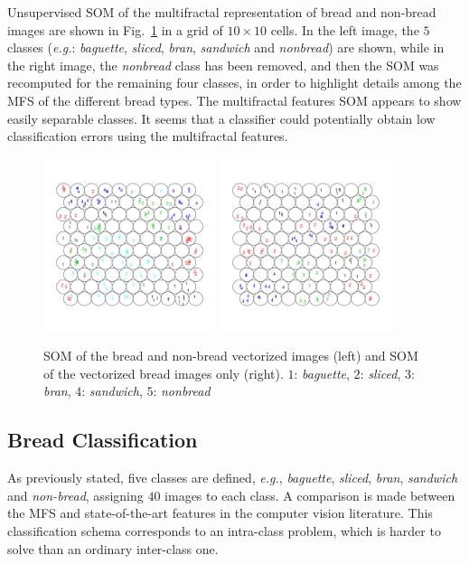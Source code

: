 \documentclass[a4paper,10pt]{article}
\begin{document}
Unsupervised SOM of the multifractal representation of bread and non-bread images are shown in Fig.~\ref{fig:somfractal} in a grid of $10\times10$ cells. In the left image, the $5$ classes ({\em e.g.}: {\em baguette}, {\em sliced}, {\em bran}, {\em sandwich} and {\em nonbread}) are shown, while in the right image, the {\em nonbread} class has been removed, and then the SOM was recomputed for the remaining four classes, in order to highlight details among the MFS of the different bread types. The multifractal features SOM appears to show easily separable classes. It seems that a classifier could potentially obtain low classification errors using the multifractal features.
\begin{figure}
\begin{centering}
\includegraphics[width=0.45\textwidth]{images/sommultifractal}
\includegraphics[width=0.45\textwidth]{images/sombreadmultifractal}
\caption{SOM of the bread and non-bread vectorized images (left) and SOM of the vectorized bread images only (right). $1$: {\em baguette}, $2$: {\em sliced}, $3$: {\em bran}, $4$: {\em sandwich}, $5$: {\em nonbread} }
\label{fig:somfractal}
\end{centering}
\end{figure}

\subsection{Bread Classification}
\label{sec:10}
As previously stated, five classes are defined, {\em e.g.}, {\em baguette}, {\em sliced}, {\em bran}, {\em sandwich} and {\em non-bread}, assigning $40$ images to each class. A comparison is made between the MFS and state-of-the-art features in the computer vision literature. This classification schema corresponds to an intra-class problem, which is harder to solve than an ordinary inter-class one. 
\end{document}

